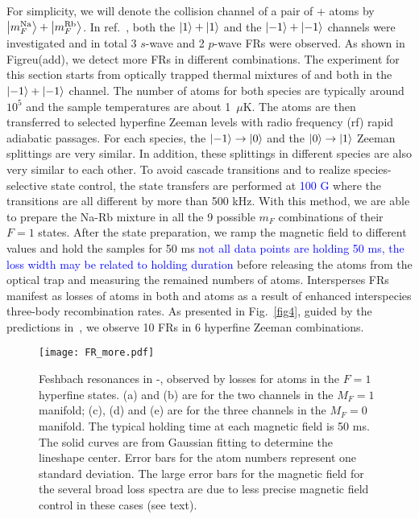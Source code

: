 For simplicity, we will denote the collision channel of a pair of \Na + \Rb atoms by $\ket{m_F^{\rm Na}}+\ket{m_F^{\rm Rb}}$. In ref.~\cite{Wang2013}, both the $\ket{1}+\ket{1}$ and the $\ket{-1}+\ket{-1}$ channels were investigated and in total 3 $s$-wave and 2 $p$-wave FRs were observed. As shown in Figreu(add), we detect more FRs in different combinations. The experiment for this section starts from optically trapped thermal mixtures of \Na and \Rb both in the $\ket{-1}+\ket{-1}$ channel. The number of atoms for both species are typically around $10^5$ and the sample temperatures are about 1~$\mu$K. The atoms are then transferred to selected hyperfine Zeeman levels with radio frequency (rf) rapid adiabatic passages. For each species, the $\ket{-1}\rightarrow \ket{0}$ and the $\ket{0}\rightarrow \ket{1}$ Zeeman splittings are very similar. In addition, these splittings in different species are also very similar to each other. To avoid cascade transitions and to realize species-selective state control, the state transfers are performed at \textcolor{blue}{100 G} where the transitions are all different by more than 500 kHz. With this method, we are able to prepare the Na-Rb mixture in all the 9 possible $m_F$ combinations of their $F = 1$ states. 
After the state preparation, we ramp the magnetic field to different values and hold the samples for 50 ms \textcolor{blue}{not all data points are holding 50 ms, the loss width may be related to holding duration} before releasing the atoms from the optical trap and measuring the remained numbers of atoms. Intersperses FRs manifest as losses of atoms in both \Na and \Rb atoms as a result of enhanced interspecies three-body recombination rates. As presented in Fig.~\ref{fig4}, guided by the predictions in~\cite{Wang2013}, we observe 10 FRs in 6 hyperfine Zeeman combinations. 

\begin{figure}[htb]
\begin{center}
\texttt{[image: FR\_more.pdf]}
\end{center}
\caption[Loss spectroscopy of Feshbach resonance with different spin combinations]{Feshbach resonances in \Na-\Rb, observed by losses for atoms in the $F = 1$ hyperfine states. (a) and (b) are for the two channels in the $M_F = 1$ manifold; (c), (d) and (e) are for the three channels in the $M_F = 0$ manifold. The typical holding time at each magnetic field is 50 ms. The solid curves are from Gaussian fitting to determine the lineshape center. Error bars for the atom numbers represent one standard deviation. The large error bars for the magnetic field for the several broad loss spectra are due to less precise magnetic field control in these cases (see text).}
\label{FR_more}
\end{figure}

